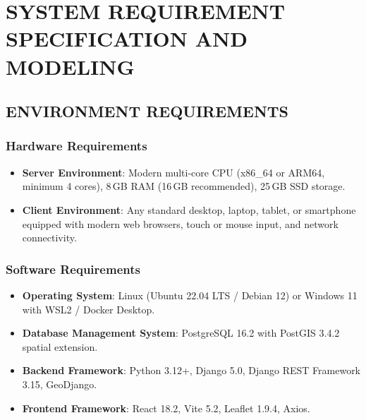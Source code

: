 \documentclass[12pt,a4paper]{report}
\begin{document}
\newpage
\chapter{SYSTEM REQUIREMENT SPECIFICATION AND MODELING}

\section{ENVIRONMENT REQUIREMENTS}

\subsection{Hardware Requirements}
\begin{itemize}
    \item \textbf{Server Environment}: Modern multi-core CPU (x86\_64 or ARM64, minimum 4 cores), 8\,GB RAM (16\,GB recommended), 25\,GB SSD storage.
    \item \textbf{Client Environment}: Any standard desktop, laptop, tablet, or smartphone equipped with modern web browsers, touch or mouse input, and network connectivity.
\end{itemize}

\subsection{Software Requirements}
\begin{itemize}
    \item \textbf{Operating System}: Linux (Ubuntu 22.04 LTS / Debian 12) or Windows 11 with WSL2 / Docker Desktop.
    \item \textbf{Database Management System}: PostgreSQL 16.2 with PostGIS 3.4.2 spatial extension.
    \item \textbf{Backend Framework}: Python 3.12+, Django 5.0, Django REST Framework 3.15, GeoDjango.
    \item \textbf{Frontend Framework}: React 18.2, Vite 5.2, Leaflet 1.9.4, Axios.
\end{itemize}
\end{document}
